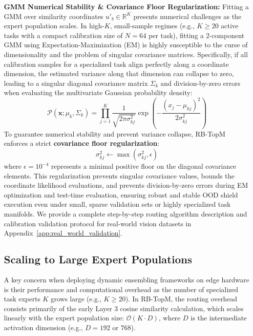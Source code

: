 \textbf{GMM Numerical Stability \& Covariance Floor Regularization:} Fitting a GMM over similarity coordinates $u'_b \in \mathbb{R}^K$ presents numerical challenges as the expert population scales. In high-$K$, small-sample regimes (e.g., $K \ge 20$ active tasks with a compact calibration size of $N=64$ per task), fitting a 2-component GMM using Expectation-Maximization (EM) is highly susceptible to the curse of dimensionality and the problem of singular covariance matrices. Specifically, if all calibration samples for a specialized task align perfectly along a coordinate dimension, the estimated variance along that dimension can collapse to zero, leading to a singular diagonal covariance matrix $\Sigma_k$ and division-by-zero errors when evaluating the multivariate Gaussian probability density:
\begin{equation}
\mathcal{P}(\mathbf{x}; \mu_k, \Sigma_k) = \prod_{j=1}^K \frac{1}{\sqrt{2\pi \sigma_{kj}^2}} \exp\left( -\frac{(x_j - \mu_{kj})^2}{2\sigma_{kj}^2} \right)
\label{eq:gmm_probability}
\end{equation}
To guarantee numerical stability and prevent variance collapse, RB-TopM enforces a strict \textbf{covariance floor regularization}:
\begin{equation}
\sigma_{kj}^2 \gets \max\left( \sigma_{kj}^2, \epsilon \right)
\label{eq:covariance_floor}
\end{equation}
where $\epsilon = 10^{-4}$ represents a minimal positive floor on the diagonal covariance elements. This regularization prevents singular covariance values, bounds the coordinate likelihood evaluations, and prevents division-by-zero errors during EM optimization and test-time evaluation, ensuring robust and stable OOD shield execution even under small, sparse validation sets or highly specialized task manifolds. We provide a complete step-by-step routing algorithm description and calibration validation protocol for real-world vision datasets in Appendix~\ref{app:real_world_validation}.

\subsection{Scaling to Large Expert Populations}
\label{sec:scaling_complexity}
A key concern when deploying dynamic ensembling frameworks on edge hardware is their performance and computational overhead as the number of specialized task experts $K$ grows large (e.g., $K \ge 20$). In RB-TopM, the routing overhead consists primarily of the early Layer 3 cosine similarity calculation, which scales linearly with the expert population size: $\mathcal{O}(K \cdot D)$, where $D$ is the intermediate activation dimension (e.g., $D = 192$ or $768$).

